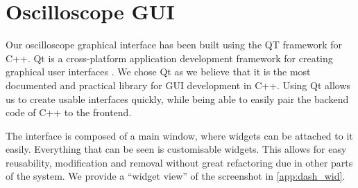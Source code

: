 \section{Oscilloscope GUI}
    Our oscilloscope graphical interface has been built using the QT framework for C++. Qt is a cross-platform application development framework for creating graphical user interfaces \cite{qt-w}. We chose Qt as we believe that it is the most documented and practical library for GUI development in C++. Using Qt allows us to create usable interfaces quickly, while being able to easily pair the backend code of C++ to the frontend.

    The interface is composed of a main window, where widgets can be attached to it easily. Everything that can be seen is customisable widgets. This allows for easy reusability, modification and removal without great refactoring due in other parts of the system. We provide a ``widget view'' of the screenshot in \cref{app:dash_wid}.
